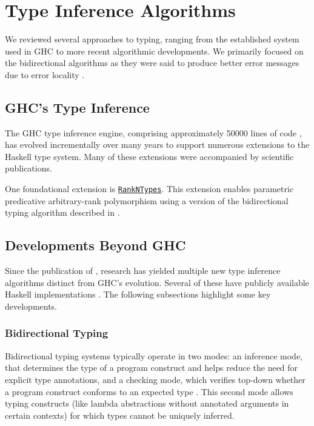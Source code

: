 \section{Type Inference Algorithms}
\label{sec:TypeInferenceAlgorithm}

We reviewed several approaches to typing, ranging from the established system used in GHC to more recent algorithmic developments. We primarily focused on the bidirectional algorithms as they were said to produce better error messages due to error locality \cite{dunfield-bidirectional-2020}.

\subsection{GHC's Type Inference}

The GHC type inference engine, comprising approximately 50000 lines of code \cite{jones-typechecker-2023}, has evolved incrementally over many years to support numerous extensions to the Haskell type system. Many of these extensions were accompanied by scientific publications.

One foundational extension is \href{https://gitlab.haskell.org/haskell/prime/-/wikis/RankNTypes}{\texttt{RankNTypes}}. This extension enables parametric predicative arbitrary-rank polymorphism using a version of the bidirectional typing algorithm described in \cite{jones-practical-2007}.

\subsection{Developments Beyond GHC}

Since the publication of \cite{jones-practical-2007}, research has yielded multiple new type inference algorithms distinct from GHC's evolution. Several of these have publicly available Haskell implementations \cite{github-goldenberg-artem-goldenbergbidirectionalsystem-2025, github-choi-kwanghoonbidi-2025, github-chen-cu1ch3ntype-inference-zoo-2025}. The following subsections highlight some key developments.

\subsubsection{Bidirectional Typing}

Bidirectional typing systems typically operate in two modes: an inference mode, that determines the type of a program construct and helps reduce the need for explicit type annotations, and a checking mode, which verifies top-down whether a program construct conforms to an expected type \cite{dunfield-bidirectional-2020}. This second mode allows typing constructs (like lambda abstractions without annotated arguments in certain contexts) for which types cannot be uniquely inferred.

